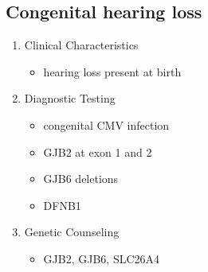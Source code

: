\documentclass[12pt]{scrartcl}
\begin{document}
\subsection{Congenital hearing loss}
\label{sec:org263c556}
\begin{enumerate}
\item Clinical Characteristics
\label{sec:org24250b7}
\begin{itemize}
\item hearing loss present at birth
\end{itemize}
\item Diagnostic Testing
\label{sec:orgd7f50b6}
\begin{itemize}
\item congenital CMV infection
\item GJB2 at exon 1 and 2
\item GJB6 deletions
\item DFNB1
\end{itemize}
\item Genetic Counseling
\label{sec:org34b8921}
\begin{itemize}
\item GJB2, GJB6, SLC26A4
\end{itemize}
\end{enumerate}
\end{document}

